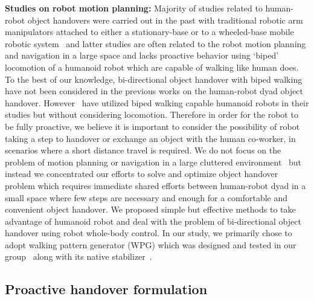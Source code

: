 \textbf{Studies on robot motion planning:} Majority of studies related to human-robot object handovers were carried out in the past with traditional robotic arm manipulators attached to either a stationary-base or to a wheeled-base mobile robotic system~\cite{medina2016human, vogt2018one, huber2008Indus, kupcsik2016learning, cakmak2011human} and latter studies are often related to the robot motion planning and navigation in a large space and lacks proactive behavior using `biped' locomotion of a humanoid robot which are capable of walking like human does. To the best of our knowledge, bi-directional object handover with biped walking have not been considered in the previous works on the human-robot dyad object handover. However~\cite{vezzani2017novel, chan2014implementation} have utilized biped walking capable humanoid robots in their studies but without considering locomotion. Therefore in order for the robot to be fully proactive, we believe it is important to consider the possibility of robot taking a step to handover or exchange an object with the human co-worker, in scenarios where a short distance travel is required. We do not focus on the problem of motion planning or navigation in a large cluttered environment~\cite{mainprice2012sharing, vahrenkamp2009humanoid, kim2004advanced} but instead we concentrated our efforts to solve and optimize object handover problem which requires immediate shared efforts between human-robot dyad in a small space where few steps are necessary and enough for a comfortable and convenient object handover. We proposed simple but effective methods to take advantage of humanoid robot and deal with the problem of bi-directional object handover using robot whole-body control. In our study, we primarily chose to adopt walking pattern generator (WPG) which was designed and tested in our group~\cite{caron2016humanoids, kajita20013d} along with its native stabilizer~\cite{caron2018stair, kajita2010biped}.

\subsection{Proactive handover formulation}

